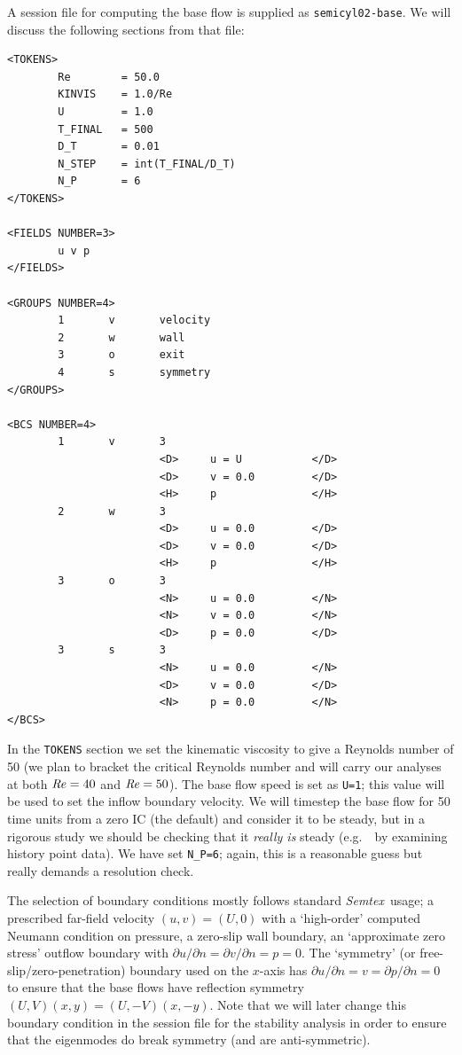 \documentclass[11pt,a4paper]{report}
\newcommand\Rey{\mbox{\textit{Re}}}
\newcommand{\eg}{e.g.\ }
\newcommand{\Semtex}{\emph{Semtex}}
\begin{document}
A session file for computing the base flow is supplied as
\verb+semicyl02-base+. We will discuss the following sections from
that file: {\small
\begin{verbatim}
<TOKENS>
        Re        = 50.0
        KINVIS    = 1.0/Re
        U         = 1.0
        T_FINAL   = 500
        D_T       = 0.01
        N_STEP    = int(T_FINAL/D_T)
        N_P       = 6
</TOKENS>

<FIELDS NUMBER=3>
        u v p
</FIELDS>

<GROUPS NUMBER=4>
        1       v       velocity
        2       w       wall
        3       o       exit
        4       s       symmetry
</GROUPS>

<BCS NUMBER=4>
        1       v       3
                        <D>     u = U           </D>
                        <D>     v = 0.0         </D>
                        <H>     p               </H>
        2       w       3
                        <D>     u = 0.0         </D>
                        <D>     v = 0.0         </D>
                        <H>     p               </H>
        3       o       3
                        <N>     u = 0.0         </N>
                        <N>     v = 0.0         </N>
                        <D>     p = 0.0         </D>
        3       s       3
                        <N>     u = 0.0         </N>
                        <D>     v = 0.0         </D>
                        <N>     p = 0.0         </N>
</BCS>
\end{verbatim}
} In the \verb+TOKENS+ section we set the kinematic viscosity to give
a Reynolds number of 50 (we plan to bracket the critical Reynolds
number and will carry our analyses at both $\Rey=40$ and $\Rey=50$).
The base flow speed is set as \verb+U=1+; this value will be used to
set the inflow boundary velocity.  We will timestep the base flow for
50 time units from a zero IC (the default) and consider it to be
steady, but in a rigorous study we should be checking that it
\emph{really is} steady (\eg\ by examining history point data). We
have set \verb+N_P=6+; again, this is a reasonable guess but really
demands a resolution check.

The selection of boundary conditions mostly follows standard
\Semtex\ usage; a prescribed far-field velocity $(u,v)=(U,0)$ with a
`high-order' computed Neumann condition on pressure, a zero-slip wall
boundary, an `approximate zero stress' outflow boundary with $\partial
u/\partial n=\partial v/\partial n = p = 0$.  The `symmetry' (or
free-slip/zero-penetration) boundary used on the $x$-axis has
$\partial u/\partial n=v=\partial p/\partial n=0$ to ensure that the
base flows have reflection symmetry $(U,V)(x,y)=(U,-V)(x,-y)$.  Note
that we will later change this boundary condition in the session file
for the stability analysis in order to ensure that the eigenmodes do
break symmetry (and are anti-symmetric).
\end{document}
